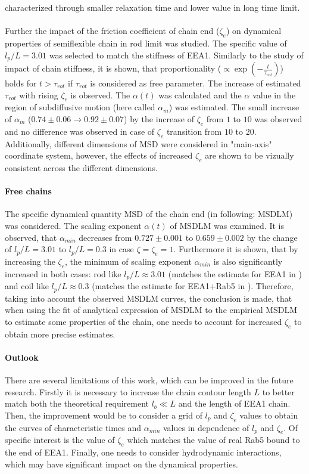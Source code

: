 \documentclass[
    paper=A4,pagesize=automedia,fontsize=12pt,
    BCOR=15mm,DIV=22,
    twoside,headinclude,footinclude=false,
    fleqn,             %
    bibliography=totocnumbered,          %
    listof=totoc,                %
    listof=flat,                 %
    cleardoublepage=empty      %
    numbers=endperiod
]{scrartcl}
\begin{document}
characterized through smaller relaxation time and lower value in long time limit.
\\
\\
Further the impact of the friction coefficient of chain end ($\zeta_e$) 
on dynamical properties of semiflexible chain in rod limit was studied.
The specific value of $l_p/L=3.01$ was selected to match the stiffness of
EEA1. Similarly to the study of impact of chain stiffness, it is shown,
that proportionality ($\propto \exp\left(-\frac{t}{\tau_{rot}}\right)$) holds
for $t>\tau_{rot}$ if $\tau_{rot}$ is considered as free parameter.
The increase of estimated $\tau_{rot}$ with rising $\zeta_e$ is observed.
The $\alpha(t)$ was calculated and the $\alpha$ value in the region of subdiffusive motion
(here called $\alpha_m$) was estimated. The small
increase of $\alpha_m$
($0.74 \pm 0.06 \rightarrow 0.92 \pm 0.07$) by the 
increase of $\zeta_e$ from $1$ to $10$ was observed and no difference was observed
in case of $\zeta_e$ transition from $10$ to $20$. Additionally, different dimensions
of MSD were considered in "main-axis" coordinate system, however, the effects of 
increased $\zeta_e$ are shown to be vizually consistent across the different dimensions.

\paragraph{Free chains}
The specific dynamical quantity MSD of the chain end (in following: MSDLM) was 
considered. The scaling exponent $\alpha(t)$ of MSDLM was examined. 
It is observed, that $\alpha_{min}$ decreases from $0.727 \pm 0.001$ to $0.659 \pm 0.002$ 
by the change of $l_p/L=3.01$ to $l_p/L=0.3$ in case $\zeta=\zeta_e=1$.
Furthermore it is shown, that
by increasing the $\zeta_e$, the minimum of scaling exponent $\alpha_{min}$ is also 
significantly increased in both cases: rod like $l_p/L \approx 3.01$ (matches the 
estimate for EEA1 in \cite{Singh:2022}) and
coil like  $l_p/L \approx 0.3$ (matches the estimate for EEA1+Rab5 in \cite{Singh:2022}).
Therefore, taking into account the observed MSDLM curves, the conclusion is made,
that when using the fit of analytical expression of MSDLM to the empirical MSDLM 
to estimate some properties of the chain, one needs to account
for increased $\zeta_e$ to obtain more precise estimates.

\paragraph{Outlook}
There are several limitations of this work, which can be improved in the future research.
Firstly it is necessary to increase the chain contour length $L$ to better match both the
theoretical requirement $l_b \ll L$ and the length of EEA1 chain. Then, the improvement 
would be to consider a grid of $l_p$ and $\zeta_e$ values to obtain the 
curves of characteristic times and $\alpha_{min}$ values in dependence of 
$l_p$ and $\zeta_e$. Of specific interest is the value of $\zeta_e$ which matches 
the value of real Rab5 bound to the end of EEA1. Finally, one needs to
consider hydrodynamic interactions, which may have significant impact on the dynamical
properties.  
\end{document}
